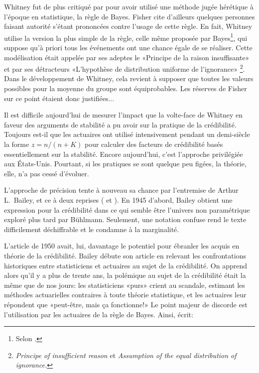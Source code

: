 Whitney fut de plus critiqué par \cite{Fisher:Whitney:discussion:1919}
pour avoir utilisé une méthode jugée hérétique à l'époque en
statistique, la règle de Bayes. Fisher cite d'ailleurs quelques
personnes faisant autorité s'étant prononcées contre l'usage de cette
règle. En fait, Whitney utilise la version la plus simple de la règle,
celle même proposée par Bayes\footnote{%
  Selon \cite{Bailey:1950}.}, %
qui suppose qu'à priori tous les événements ont une chance égale de se
réaliser. Cette modélisation était appelée par ses adeptes le
«Principe de la raison insuffisante» et par ses détracteurs
«L'hypothèse de distribution uniforme de l'ignorance»%
\footnote{\emph{Principe of insufficient reason} et \emph{Assumption
    of the equal distribution of ignorance.}}. %
Dans le développement de Whitney, cela revient à supposer que toutes
les valeurs possibles pour la moyenne du groupe sont équiprobables.
Les réserves de Fisher sur ce point étaient donc justifiées...

Il est difficile aujourd'hui de mesurer l'impact que la volte-face de
Whitney en faveur des arguments de stabilité a pu avoir sur la
pratique de la crédibilité. Toujours est-il que les actuaires ont
utilisé intensivement pendant un demi-siècle la forme $z = n/(n + K)$ pour
calculer des facteurs de crédibilité basés essentiellement sur la
stabilité. Encore aujourd'hui, c'est l'approche privilégiée aux
États-Unis. Pourtant, si les pratiques se sont quelque peu figées, la
théorie, elle, n'a pas cessé d'évoluer.

L'approche de précision tente à nouveau sa chance par l'entremise de
Arthur L.~Bailey, et ce à deux reprises (\cite{Bailey:1945} et
\cite{Bailey:1950}). En 1945 d'abord, Bailey obtient une expression pour
la crédibilité dans ce qui semble être l'univers non paramétrique
exploré plus tard par Bühlmann. Seulement, une notation confuse rend
le texte difficilement déchiffrable et le condamne à la marginalité.

L'article de 1950 avait, lui, davantage le potentiel pour ébranler les
acquis en théorie de la crédibilité. Bailey débute son article en
relevant les confrontations historiques entre statisticiens et
actuaires au sujet de la crédibilité. On apprend alors qu'il y a plus
de trente ans, la polémique au sujet de la crédibilité était la même
que de nos jours: les statisticiens «purs» crient au scandale,
estimant les méthodes actuarielles contraires à toute théorie
statistique, et les actuaires leur répondent que «peut-être, mais ça
fonctionne!» Le point majeur de discorde est l'utilisation par les
actuaires de la règle de Bayes. Ainsi, \cite{Bailey:1950} écrit:

